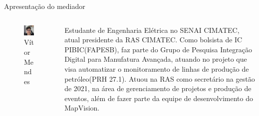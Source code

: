 \documentclass{cubeamer}
\begin{document}
\begin{frame}{Apresentação do mediador}
    \begin{columns}
        \centering
        \begin{column}{0.3\textwidth}
            \begin{figure}
                \centering
                \includegraphics[height = 0.5\textheight]{img/mediador.png}
                \caption[]{Vítor Mendes}
            \end{figure}
        \end{column}
        \centering
        \begin{column}{0.5\textwidth}
            \footnotesize
            \justifying
            Estudante de Engenharia Elétrica no SENAI CIMATEC, atual presidente da RAS CIMATEC. Como bolsista de IC PIBIC(FAPESB), faz parte do Grupo de Pesquisa Integração Digital para Manufatura Avançada, atuando no projeto que visa automatizar o monitoramento de linhas de produção de petróleo(PRH 27.1). Atuou na RAS como secretário na gestão de 2021, na área de gerenciamento de projetos e produção de eventos, além de fazer parte da equipe de desenvolvimento do MapVision.

        \end{column}
    \end{columns}
\end{frame}
\end{document}
